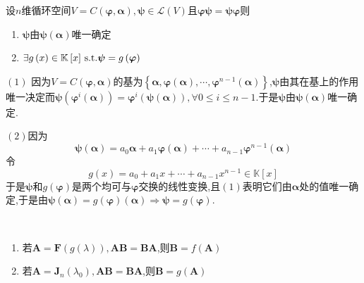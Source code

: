 \begin{formal}
    \begin{proposition}[唯一确定可交换的线性变换]\label{prop:唯一确定可交换的线性变换}
        设$n$维循环空间$V=C\left(
            \bm{\varphi},\bm{\alpha}
        \right),\bm{\psi}\in\mathcal{L}\left(
            V
        \right)$且$
        \bm{\varphi\psi}=\bm{\psi\varphi}
        $则\begin{enumerate}[label={\textup{(\arabic*)}}]
            \item $\bm{\psi}$由$\bm{\psi}\left(\bm{\alpha}\right)$唯一确定
            \item $\exists g\left(x\right)\in\mathbb{K}\left[x\right]\,\textup{s.t.}\bm{\psi}=g\left(\bm{\varphi}\right)$
        \end{enumerate}
    \end{proposition}
    \begin{Proof}$(1)$
        因为$V=C\left(
            \bm{\varphi},\bm{\alpha}
        \right)$的基为$\left\{
            \bm{\alpha},\bm{\varphi}\left(\bm{\alpha}\right),\cdots,\bm{\varphi}^{n-1}\left(\bm{\alpha}\right)
        \right\}$,$\bm{\psi}$由其在基上的作用唯一决定而$\bm{\psi}\left(
            \bm{\varphi}^i\left(
                \bm{\alpha}
            \right)
        \right)=\bm{\varphi}^i\left(
            \bm{\psi}\left(
                \bm{\alpha}
            \right)
        \right),\forall 0\leqslant i\leqslant n-1$.于是$\bm{\psi}$由$\bm{\psi}\left(
            \bm{\alpha}
        \right)$唯一确定.

        $(2)$因为\[
        \bm{\psi}\left(\bm{\alpha}\right)=
        a_0\bm{\alpha}+a_1\bm{\varphi}\left(\bm{\alpha}\right)+\cdots+a_{n-1}\bm{\varphi}^{n-1}\left(\bm{\alpha}\right)
        \]令\[
        g\left(x\right)=a_0+a_1x+\cdots+a_{n-1}x^{n-1}\in\mathbb{K}\left[x\right]
        \]于是$\bm{\psi}$和$g\left(\bm{\varphi}\right)$是两个均可与$\bm{\varphi}$交换的线性变换,且$(1)$表明它们由$\bm{\alpha}$处的值唯一确定,于是由$\bm{\psi}\left(
            \bm{\alpha}
        \right)=g\left(
            \bm{\varphi}
        \right)\left(
            \bm{\alpha}
        \right)\Longrightarrow \bm{\psi}=g\left(
            \bm{\varphi}
        \right).$
    \end{Proof}
\end{formal}
\begin{green}
    \begin{corollary}[相关推论]\label{cor:相关推论}
        \,
        
        \begin{enumerate}[label={\textup{(\arabic*)}}]
            \item 若$\bm{A}=\bm{F}\left(g\left(\lambda\right)\right),\bm{AB}=\bm{BA}$,则$\bm{B}=f\left(\bm{A}\right)$
            \item 若$\bm{A}=\bm{J}_n\left(\lambda_0\right),\bm{AB}=\bm{BA}$,则$\bm{B}=g\left(\bm{A}\right)$
        \end{enumerate}
    \end{corollary}
\end{green}
\newpage
